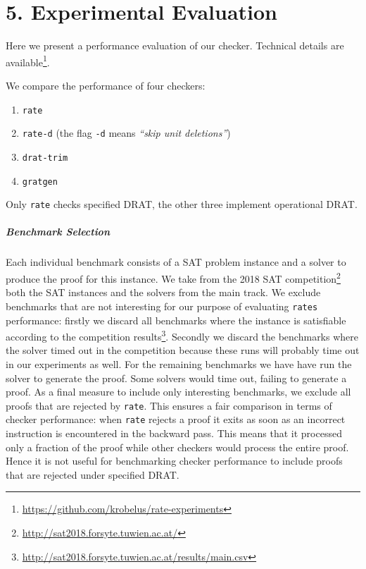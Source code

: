 \documentclass[
]{report}
\providecommand{\tightlist}{%
  \setlength{\itemsep}{0pt}\setlength{\parskip}{0pt}}
\begin{document}
\hypertarget{experimental-evaluation}{%
\chapter{5. Experimental Evaluation}\label{experimental-evaluation}}

Here we present a performance evaluation of our checker. Technical
details are available\footnote{\url{https://github.com/krobelus/rate-experiments}}.

We compare the performance of four checkers:

\begin{enumerate}
\def\labelenumi{\arabic{enumi}.}
\tightlist
\item
  \texttt{rate}
\item
  \texttt{rate-d} \hfill (the flag \texttt{-d} means \emph{``skip unit
  deletions''})
\item
  \texttt{drat-trim}
\item
  \texttt{gratgen}
\end{enumerate}

Only \texttt{rate} checks specified DRAT, the other three implement
operational DRAT.

\paragraph{Benchmark Selection}

Each individual benchmark consists of a SAT problem instance and a
solver to produce the proof for this instance. We take from the 2018 SAT
competition\footnote{\url{http://sat2018.forsyte.tuwien.ac.at/}} both
the SAT instances and the solvers from the main track. We exclude
benchmarks that are not interesting for our purpose of evaluating
\texttt{rate\textquotesingle{}s} performance: firstly we discard all
benchmarks where the instance is satisfiable according to the
competition results\footnote{\url{http://sat2018.forsyte.tuwien.ac.at/results/main.csv}}.
Secondly we discard the benchmarks where the solver timed out in the
competition because these runs will probably time out in our experiments
as well. For the remaining benchmarks we have have run the solver to
generate the proof. Some solvers would time out, failing to generate a
proof. As a final measure to include only interesting benchmarks, we
exclude all proofs that are rejected by \texttt{rate}. This ensures a
fair comparison in terms of checker performance: when \texttt{rate}
rejects a proof it exits as soon as an incorrect instruction is
encountered in the backward pass. This means that it processed only a
fraction of the proof while other checkers would process the entire
proof. Hence it is not useful for benchmarking checker performance to
include proofs that are rejected under specified DRAT.
\end{document}
